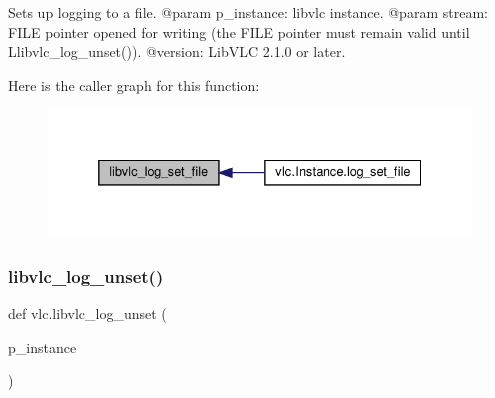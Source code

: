 \begin{DoxyVerb}Sets up logging to a file.
@param p_instance: libvlc instance.
@param stream: FILE pointer opened for writing (the FILE pointer must remain valid until L{libvlc_log_unset}()).
@version: LibVLC 2.1.0 or later.
\end{DoxyVerb}
 Here is the caller graph for this function\+:
\nopagebreak
\begin{figure}[H]
\begin{center}
\leavevmode
\includegraphics[width=332pt]{namespacevlc_aa18225aa223a1abfd7245a682fd599a0_icgraph}
\end{center}
\end{figure}
\mbox{\label{namespacevlc_ab8183b479ddf3d672f4044a9a3805b06}} 
\subsubsection{\texorpdfstring{libvlc\+\_\+log\+\_\+unset()}{libvlc\_log\_unset()}}
{\footnotesize\ttfamily def vlc.\+libvlc\+\_\+log\+\_\+unset (\begin{DoxyParamCaption}\item[{}]{p\+\_\+instance }\end{DoxyParamCaption})}

